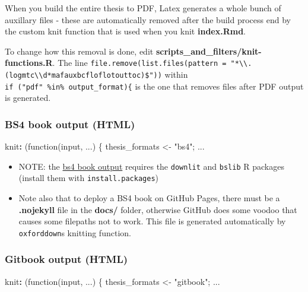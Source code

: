 \documentclass[a4paper, nobind]{templates/ociamthesis}
\providecommand{\tightlist}{%
  \setlength{\itemsep}{0pt}\setlength{\parskip}{0pt}}
\newenvironment{Shaded}{\begin{snugshade}}{\end{snugshade}}
\newcommand{\AttributeTok}[1]{\textcolor[rgb]{0.77,0.63,0.00}{#1}}
\newcommand{\FunctionTok}[1]{\textcolor[rgb]{0.00,0.00,0.00}{#1}}
\newcommand{\KeywordTok}[1]{\textcolor[rgb]{0.13,0.29,0.53}{\textbf{#1}}}
\renewenvironment{Shaded}
{
  \vspace{10pt}%
  \begin{snugshade}%
}{%
  \end{snugshade}%
  \vspace{8pt}%
}
\begin{document}
When you build the entire thesis to PDF, Latex generates a whole bunch of auxillary files - these are automatically removed after the build process end by the custom knit function that is used when you knit \textbf{index.Rmd}.

To change how this removal is done, edit \textbf{scripts\_and\_filters/knit-functions.R}.
The line \texttt{file.remove(list.files(pattern\ =\ "*\textbackslash{}\textbackslash{}.(log\textbar{}mtc\textbackslash{}\textbackslash{}d*\textbar{}maf\textbar{}aux\textbar{}bcf\textbar{}lof\textbar{}lot\textbar{}out\textbar{}toc)\$"))} within \texttt{if\ ("pdf"\ \%in\%\ output\_format)\{} is the one that removes files after PDF output is generated.

\hypertarget{bs4-book-output-html}{%
\subsubsection{BS4 book output (HTML)}\label{bs4-book-output-html}}

\begin{Shaded}
\begin{Highlighting}[]
\FunctionTok{knit}\KeywordTok{:}\AttributeTok{ (function(input, ...) \{}
\AttributeTok{    thesis\_formats \textless{}{-} "bs4";}
\AttributeTok{    ...}
\end{Highlighting}
\end{Shaded}

\begin{itemize}
\tightlist
\item
  NOTE: the \href{https://pkgs.rstudio.com/bookdown/reference/bs4_book.html}{bs4 book output} requires the \texttt{downlit} and \texttt{bslib} R packages (install them with \texttt{install.packages})
\item
  Note also that to deploy a BS4 book on GitHub Pages, there must be a \textbf{.nojekyll} file in the \textbf{docs/} folder, otherwise GitHub does some voodoo that causes some filepaths not to work. This file is generated automatically by \texttt{oxforddown}s knitting function.
\end{itemize}

\hypertarget{gitbook-output-html}{%
\subsubsection{Gitbook output (HTML)}\label{gitbook-output-html}}

\begin{Shaded}
\begin{Highlighting}[]
\FunctionTok{knit}\KeywordTok{:}\AttributeTok{ (function(input, ...) \{}
\AttributeTok{    thesis\_formats \textless{}{-} "gitbook";}
\AttributeTok{    ...}
\end{Highlighting}
\end{Shaded}
\end{document}
